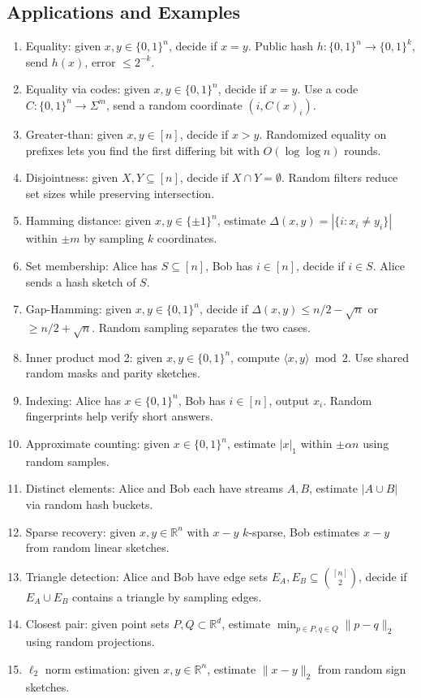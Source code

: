 \documentclass[11pt]{article}
\begin{document}
\subsection{Applications and Examples}
\begin{enumerate}[leftmargin=1.2em]
    \item Equality: given $x,y \in \{0,1\}^n$, decide if $x=y$. Public hash $h:\{0,1\}^n \to \{0,1\}^k$, send $h(x)$, error $\le 2^{-k}$.
    \item Equality via codes: given $x,y \in \{0,1\}^n$, decide if $x=y$. Use a code $C:\{0,1\}^n \to \Sigma^m$, send a random coordinate $(i,C(x)_i)$.
    \item Greater-than: given $x,y \in [n]$, decide if $x>y$. Randomized equality on prefixes lets you find the first differing bit with $O(\log\log n)$ rounds.
    \item Disjointness: given $X,Y \subseteq [n]$, decide if $X \cap Y = \emptyset$. Random filters reduce set sizes while preserving intersection.
    \item Hamming distance: given $x,y \in \{\pm1\}^n$, estimate $\Delta(x,y)=|\{i:x_i \ne y_i\}|$ within $\pm m$ by sampling $k$ coordinates.
    \item Set membership: Alice has $S \subseteq [n]$, Bob has $i \in [n]$, decide if $i \in S$. Alice sends a hash sketch of $S$.
    \item Gap-Hamming: given $x,y \in \{0,1\}^n$, decide if $\Delta(x,y) \le n/2 - \sqrt{n}$ or $\ge n/2 + \sqrt{n}$. Random sampling separates the two cases.
    \item Inner product mod 2: given $x,y \in \{0,1\}^n$, compute $\langle x,y\rangle \bmod 2$. Use shared random masks and parity sketches.
    \item Indexing: Alice has $x \in \{0,1\}^n$, Bob has $i \in [n]$, output $x_i$. Random fingerprints help verify short answers.
    \item Approximate counting: given $x \in \{0,1\}^n$, estimate $|x|_1$ within $\pm \alpha n$ using random samples.
    \item Distinct elements: Alice and Bob each have streams $A,B$, estimate $|A \cup B|$ via random hash buckets.
    \item Sparse recovery: given $x,y \in \mathbb{R}^n$ with $x-y$ $k$-sparse, Bob estimates $x-y$ from random linear sketches.
    \item Triangle detection: Alice and Bob have edge sets $E_A,E_B \subseteq \binom{[n]}{2}$, decide if $E_A \cup E_B$ contains a triangle by sampling edges.
    \item Closest pair: given point sets $P,Q \subset \mathbb{R}^d$, estimate $\min_{p\in P,q\in Q} \|p-q\|_2$ using random projections.
    \item $\ell_2$ norm estimation: given $x,y \in \mathbb{R}^n$, estimate $\|x-y\|_2$ from random sign sketches.
\end{enumerate}
\end{document}
